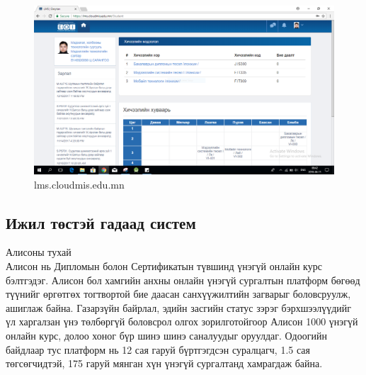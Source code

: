 \begin{figure}[htbp]
	\centering
	\includegraphics[scale=0.4]{Chart/Capture4}
	\caption[Юнимис систем]{lms.cloudmis.edu.mn}
	\label{fig:Capture4}
\end{figure}
\newpage
\subsection{Ижил төстэй гадаад систем}
Алисоны тухай\\
\hspace{1cm}Алисон нь Дипломын болон Сертификатын түвшинд үнэгүй онлайн курс бэлтгэдэг. Алисон бол хамгийн анхны онлайн үнэгүй сургалтын платформ бөгөөд түүнийг өргөтгөх тогтвортой бие даасан санхүүжилтийн загварыг боловсруулж, ашиглаж байна. Газарзүйн байрлал, эдийн засгийн статус зэрэг бэрхшээлүүдийг үл харгалзан үнэ төлбөргүй боловсрол олгох зорилготойгоор Алисон 1000 үнэгүй онлайн курс, долоо хоног бүр шинэ шинэ саналуудыг оруулдаг. Одоогийн байдлаар тус платформ нь 12 сая гаруй бүртгэгдсэн суралцагч, 1.5 сая төгсөгчидтэй, 175 гаруй мянган хүн үнэгүй сургалтанд хамрагдаж байна. 

